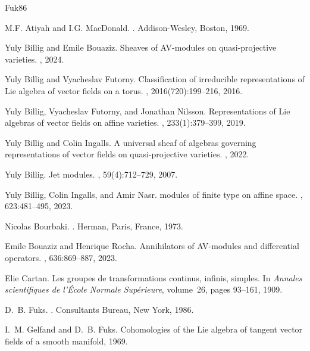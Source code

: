 \documentclass[12pt]{amsart}
\theoremstyle{definition}
\begin{document}
\begin{thebibliography}{{Fuk}86}

M.F. Atiyah and I.G. MacDonald.
.
\newblock Addison-Wesley, Boston, 1969.

Yuly Billig and Emile Bouaziz.
\newblock Sheaves of {AV}-modules on quasi-projective varieties.
, 2024.

Yuly Billig and Vyacheslav Futorny.
\newblock Classification of irreducible representations of {Lie} algebra of
  vector fields on a torus.
, 2016(720):199--216, 2016.

Yuly Billig, Vyacheslav Futorny, and Jonathan Nilsson.
\newblock Representations of {Lie} algebras of vector fields on affine
  varieties.
, 233(1):379--399, 2019.

Yuly {Billig} and Colin {Ingalls}.
\newblock A universal sheaf of algebras governing representations of vector
  fields on quasi-projective varieties.
, 2022.

Yuly Billig.
\newblock Jet modules.
, 59(4):712--729, 2007.

Yuly Billig, Colin Ingalls, and Amir Nasr.
 modules of finite type on affine space.
, 623:481--495, 2023.

Nicolas Bourbaki.
.
\newblock Herman, Paris, France, 1973.

Emile Bouaziz and Henrique Rocha.
\newblock Annihilators of {AV}-modules and differential operators.
, 636:869--887, 2023.

Elie Cartan.
\newblock Les groupes de transformations continus, infinis, simples.
\newblock In {\em Annales scientifiques de l'{\'E}cole Normale Sup{\'e}rieure},
  volume~26, pages 93--161, 1909.

D.~B. {Fuks}.
.
\newblock Consultants Bureau, New York, 1986.

I.~M. Gelfand and D.~B. Fuks.
\newblock Cohomologies of the {L}ie algebra of tangent vector fields of a
  smooth manifold, 1969.


\end{thebibliography}
\end{document}
